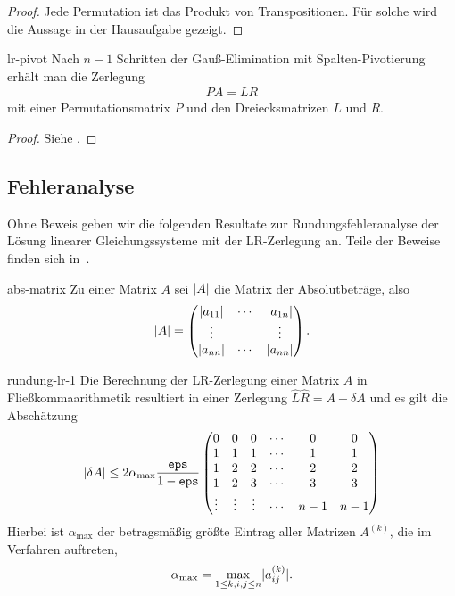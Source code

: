 \begin{proof}
  Jede Permutation ist das Produkt von Transpositionen. Für solche
  wird die Aussage in der Hausaufgabe gezeigt.
\end{proof}

\begin{Satz}{lr-pivot}
  Nach $n-1$ Schritten der Gauß-Elimination mit Spalten-Pivotierung
  erhält man die Zerlegung
  \begin{gather}
    PA = LR
  \end{gather}
  mit einer Permutationsmatrix $P$ und den Dreiecksmatrizen $L$ und $R$.
\end{Satz}

\begin{proof}
  Siehe \cite[Abschnitt 1.3]{DeuflhardHohmann08}.
\end{proof}

\subsection{Fehleranalyse}

Ohne Beweis geben wir die folgenden Resultate zur
Rundungsfehleranalyse der Lösung linearer Gleichungssysteme mit der
LR-Zerlegung an. Teile der Beweise finden sich in~\cite{Stoer83}.

\begin{Notation}{abs-matrix}
  Zu einer Matrix $A$ sei $\lvert A\rvert$ die Matrix der Absolutbeträge, also
  \begin{gather}
    \lvert A\rvert =
    \begin{pmatrix}
      \lvert a_{11}\rvert & \cdots & \lvert a_{1n}\rvert \\
      \vdots && \vdots\\
      \lvert a_{nn}\rvert & \cdots & \lvert a_{nn}\rvert
    \end{pmatrix}.
  \end{gather}
\end{Notation}

\begin{Lemma}{rundung-lr-1}
  Die Berechnung der LR-Zerlegung einer Matrix $A$ in
  Fließkommaarithmetik resultiert in einer Zerlegung
  $\widehat L \widehat R = A+\delta A$ und es gilt die Abschätzung
  \begin{gather}
    \lvert\delta A\rvert \le 2\alpha_{\max} \frac{\texttt{eps}}{1-\texttt{eps}}
    \begin{pmatrix}
      0&0&0&\cdots&0&0\\
      1&1&1&\cdots&1&1\\
      1&2&2&\cdots&2&2\\
      1&2&3&\cdots&3&3\\
      \vdots&\vdots&\vdots&\cdots&n-1&n-1
    \end{pmatrix}
  \end{gather}
  Hierbei ist $\alpha_{\max}$ der betragsmäßig größte Eintrag
  aller Matrizen $A^{(k)}$, die im Verfahren auftreten,
  \begin{gather}
    \alpha_{\max} = \max_{1\le k,i,j\le n} \lvert a^{(k)}_{ij}\rvert.
  \end{gather}
\end{Lemma}

